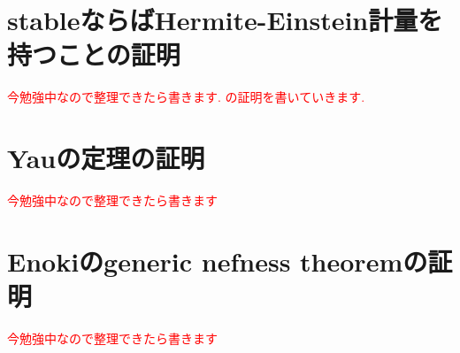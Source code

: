 \documentclass[dvipdfmx,a4paper,11pt]{article} %
\newtheorem{thm}{Theorem}[section]
\theoremstyle{definition}
\theoremstyle{remark}
\numberwithin{equation}{section}
\newcommand{\End}[0]{\operatorname{End}}
\newcommand{\xr}[1]{\textcolor{red}{#1}}
\begin{document}

\section{stableならばHermite-Einstein計量を持つことの証明}
\xr{今勉強中なので整理できたら書きます. \cite{JMS22}の証明を書いていきます.}

\section{Yauの定理の証明}
\xr{今勉強中なので整理できたら書きます}

\section{Enokiのgeneric nefness theoremの証明}
\xr{今勉強中なので整理できたら書きます}
\end{document}

